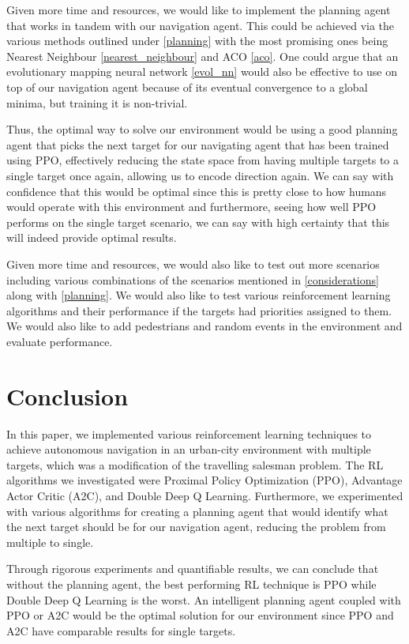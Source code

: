 \documentclass{article}
\begin{document}
	Given more time and resources, we would like to implement the planning agent that works in tandem with our navigation agent. This could be achieved via the various methods outlined under \ref{planning} with the most promising ones being Nearest Neighbour \ref{nearest_neighbour} and ACO \ref{aco}. One could argue that an evolutionary mapping neural network \ref{evol_nn} would also be effective to use on top of our navigation agent because of its eventual convergence to a global minima, but training it is non-trivial.
	
	Thus, the optimal way to solve our environment would be using a good planning agent that picks the next target for our navigating agent that has been trained using PPO, effectively reducing the state space from having multiple targets to a single target once again, allowing us to encode direction again. We can say with confidence that this would be optimal since this is pretty close to how humans would operate with this environment and furthermore, seeing how well PPO performs on the single target scenario, we can say with high certainty that this will indeed provide optimal results.
	
	Given more time and resources, we would also like to test out more scenarios including various combinations of the scenarios mentioned in \ref{considerations} along with \ref{planning}. We would also like to test various reinforcement learning algorithms and their performance if the targets had priorities assigned to them. We would also like to add pedestrians and random events in the environment and evaluate performance.
	
	\section{Conclusion}
	In this paper, we implemented various reinforcement learning techniques to achieve autonomous navigation in an urban-city environment with multiple targets, which was a modification of the travelling salesman problem. The RL algorithms we investigated were Proximal Policy Optimization (PPO), Advantage Actor Critic (A2C), and Double Deep Q Learning. Furthermore, we experimented with various algorithms for creating a planning agent that would identify what the next target should be for our navigation agent, reducing the problem from multiple to single.
	
	Through rigorous experiments and quantifiable results, we can conclude that without the planning agent, the best performing RL technique is PPO while Double Deep Q Learning is the worst. An intelligent planning agent coupled with PPO or A2C would be the optimal solution for our environment since PPO and A2C have comparable results for single targets.
	
\end{document}
